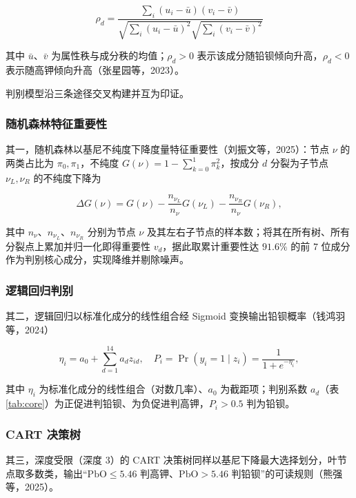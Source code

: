 \documentclass{ctexart}
\begin{document}
\begin{equation*}
\rho_{d}=\frac{\sum_{i}(u_{i}-\bar{u})(v_{i}-\bar{v})}{\sqrt{\sum_{i}(u_{i}-\bar{u})^{2}}\sqrt{\sum_{i}(v_{i}-\bar{v})^{2}}}
\end{equation*}

其中 $\bar u$、$\bar v$ 为属性秩与成分秩的均值；$\rho_{d}>0$ 表示该成分随铅钡倾向升高，$\rho_{d}<0$ 表示随高钾倾向升高（张星园等，2023）。

判别模型沿三条途径交叉构建并互为印证。

\subsubsection{随机森林特征重要性}

其一，随机森林以基尼不纯度下降度量特征重要性（刘振文等，2025）：节点 $\nu$ 的两类占比为 $\pi_0,\pi_1$，不纯度 $G(\nu)=1-\sum_{k=0}^{1}\pi_k^2$，按成分 $d$ 分裂为子节点 $\nu_L,\nu_R$ 的不纯度下降为

\begin{equation*}
\Delta G(\nu)=G(\nu)-\frac{n_{\nu_L}}{n_\nu}G(\nu_L)-\frac{n_{\nu_R}}{n_\nu}G(\nu_R),
\end{equation*}

其中 $n_\nu$、$n_{\nu_L}$、$n_{\nu_R}$ 分别为节点 $\nu$ 及其左右子节点的样本数；将其在所有树、所有分裂点上累加并归一化即得重要性 $v_d$，据此取累计重要性达 $91.6\%$ 的前 $7$ 位成分作为判别核心成分，实现降维并剔除噪声。

\subsubsection{逻辑回归判别}

其二，逻辑回归以标准化成分的线性组合经 Sigmoid 变换输出铅钡概率（钱鸿羽等，2024）

\begin{equation*}
\eta_{i}=a_{0}+\sum_{d=1}^{14}a_{d}z_{id},\quad P_{i}=\Pr(y_{i}=1\mid z_{i})=\frac{1}{1+e^{-\eta_{i}}},
\end{equation*}

其中 $\eta_i$ 为标准化成分的线性组合（对数几率）、$a_0$ 为截距项；判别系数 $a_d$（表 \ref{tab:core}）为正促进判铅钡、为负促进判高钾，$P_i>0.5$ 判为铅钡。

\subsubsection{CART 决策树}

其三，深度受限（深度 $3$）的 CART 决策树同样以基尼下降最大选择划分，叶节点取多数类，输出“$\mathrm{PbO}\le5.46$ 判高钾、$\mathrm{PbO}>5.46$ 判铅钡”的可读规则（熊强等，2025）。
\end{document}
